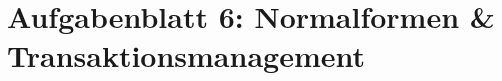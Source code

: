 \documentclass{lehramt-informatik-haupt}
\begin{document}
\chapter{Aufgabenblatt 6: Normalformen \& Transaktionsmanagement}

%


%


%



%


\end{document}
